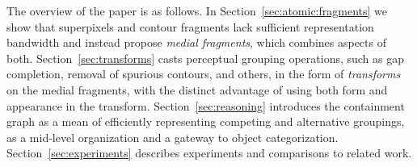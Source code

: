 The overview of the paper is as follows. In Section~\ref{sec:atomic:fragments} we show that superpixels and contour fragments lack sufficient representation
bandwidth and instead propose   \textit{medial fragments}, which combines
aspects of both. Section~\ref{sec:transforms}
casts perceptual grouping operations,  such as gap completion, removal of spurious contours,
and others, in the form of  \textit{transforms} on the medial fragments,
with the distinct advantage of using both form and appearance in the transform.
 Section~\ref{sec:reasoning} introduces the containment graph as a mean of efficiently representing competing and alternative groupings, as a mid-level
organization and a gateway to object categorization. Section~\ref{sec:experiments} describes experiments and comparisons to related work. 



